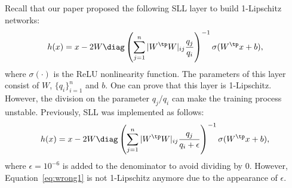 \documentclass{article} \usepackage{iclr2023_conference,times}
\newcommand{\0}{\mathbf{0} }
\begin{document}
Recall that our paper proposed the following SLL layer to build 1-Lipschitz networks:
\begin{equation}\label{eq:reSLL}
  h(x) = x - 2W\diag\left(\sum_{j=1}^n |W^\tp W|_{ij} \frac{q_j}{q_i} \right)
  ^{-1}\sigma(W^\tp x+b),
\end{equation}
where $\sigma(\cdot)$ is the ReLU nonlinearity function.
The parameters of this layer consist of $W$, $\{q_i\}_{i=1}^n$ and $b$. 
One can prove that this layer is 1-Lipschitz.
However, the division on the parameter $q_j/q_i$ can make the training process unstable.
Previously, SLL was implemented as follows:
\begin{equation}\label{eq:wrong1}
  h(x) = x - 2W\diag\left(\sum_{j=1}^n |W^\tp W|_{ij} \frac{q_j}{q_i + \epsilon} \right)
  ^{-1}\sigma(W^\tp x+b),
\end{equation}
where $\epsilon = 10^{-6}$ is added to the denominator to avoid dividing by $0$. 
However, Equation~\eqref{eq:wrong1} is not 1-Lipschitz anymore due to the appearance of $\epsilon$. 
\end{document}
